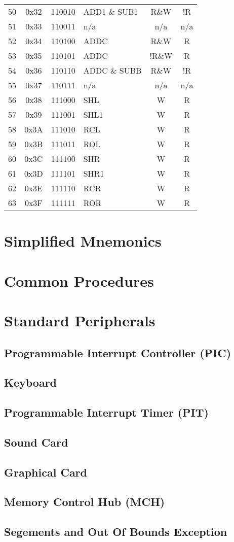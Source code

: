 \documentclass[oneside, a4paper]{memoir}
\begin{document}
\begin{center}
\begin{longtable}{ccclcc}
50 & 0x32 & 110010 & ADD1  \& SUB1   & R\&W  & !R  \\
51 & 0x33 & 110011 & n/a             & n/a   & n/a \\
52 & 0x34 & 110100 & ADDC            & R\&W  & R   \\
53 & 0x35 & 110101 & ADDC            & !R\&W & R   \\
54 & 0x36 & 110110 & ADDC  \& SUBB   & R\&W  & !R  \\
55 & 0x37 & 110111 & n/a             & n/a   & n/a \\
56 & 0x38 & 111000 & SHL             & W     & R   \\
57 & 0x39 & 111001 & SHL1            & W     & R   \\
58 & 0x3A & 111010 & RCL             & W     & R   \\
59 & 0x3B & 111011 & ROL             & W     & R   \\
60 & 0x3C & 111100 & SHR             & W     & R   \\
61 & 0x3D & 111101 & SHR1            & W     & R   \\
62 & 0x3E & 111110 & RCR             & W     & R   \\
63 & 0x3F & 111111 & ROR             & W     & R   \\
\end{longtable}
\end{center}

\chapter{Simplified Mnemonics}

\chapter{Common Procedures}

\chapter{Standard Peripherals}
\section{Programmable Interrupt Controller (PIC)}
\section{Keyboard}
\section{Programmable Interrupt Timer (PIT)}
\section{Sound Card}
\section{Graphical Card}
\section{Memory Control Hub (MCH)}
\section{Segements and Out Of Bounds Exception}
\end{document}
